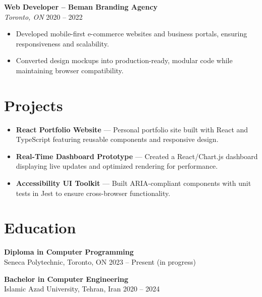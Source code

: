\documentclass[letterpaper,10pt]{article}
\begin{document}
\textbf{Web Developer – Beman Branding Agency}\\
\textit{Toronto, ON} \hfill 2020 -- 2022
\begin{itemize}[leftmargin=*]
  \item Developed mobile-first e-commerce websites and business portals, ensuring responsiveness and scalability.
  \item Converted design mockups into production-ready, modular code while maintaining browser compatibility.
\end{itemize}

\section*{Projects}
\begin{itemize}[leftmargin=*]
  \item \textbf{React Portfolio Website} — Personal portfolio site built with React and TypeScript featuring reusable components and responsive design.
  \item \textbf{Real-Time Dashboard Prototype} — Created a React/Chart.js dashboard displaying live updates and optimized rendering for performance.
  \item \textbf{Accessibility UI Toolkit} — Built ARIA-compliant components with unit tests in Jest to ensure cross-browser functionality.
\end{itemize}

\section*{Education}
\textbf{Diploma in Computer Programming} \\ Seneca Polytechnic, Toronto, ON \hfill 2023 -- Present (in progress)

\textbf{Bachelor in Computer Engineering} \\ Islamic Azad University, Tehran, Iran \hfill 2020 -- 2024
\end{document}
